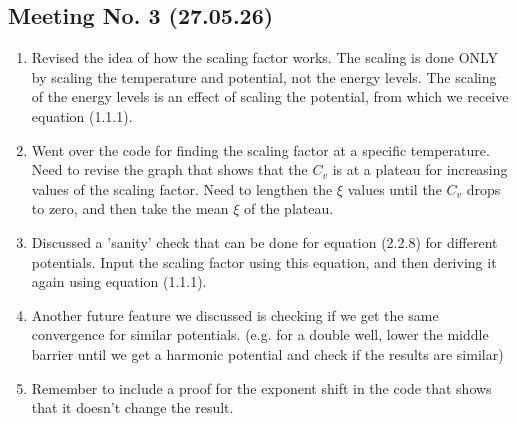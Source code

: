 \documentclass{article}
\numberwithin{equation}{subsection}
\begin{document}
\subsection*{Meeting No. 3 (27.05.26)}
\begin{enumerate}[label=\textbf{\Alph*.}]
    \item Revised the idea of how the scaling factor works. The scaling is done ONLY by scaling the temperature and potential, not the energy levels. The scaling of the energy levels is an effect of scaling the potential, from which we receive equation (1.1.1).

    \item Went over the code for finding the scaling factor at a specific temperature. Need to revise the graph that shows that the $C_v$ is at a plateau for increasing values of the scaling factor. Need to lengthen the $\xi$ values until the $C_v$ drops to zero, and then take the mean $\xi$ of the plateau.

    \item Discussed a 'sanity' check that can be done for equation (2.2.8) for different potentials. Input the scaling factor using this equation, and then deriving it again using equation (1.1.1). 

    \item Another future feature we discussed is checking if we get the same convergence for similar potentials. (e.g. for a double well, lower the middle barrier until we get a harmonic potential and check if the results are similar)

    \item Remember to include a proof for the exponent shift in the code that shows that it doesn't change the result.
\end{enumerate}
\end{document}
